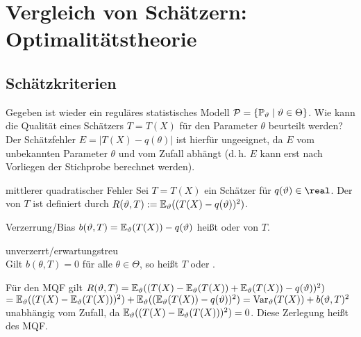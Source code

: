 \section{%
    Vergleich von Schätzern: Optimalitätstheorie%
}

\subsection{%
    Schätzkriterien%
}

\begin{Bem}
    Gegeben ist wieder ein reguläres statistisches Modell
    $\mathcal{P} = \{\mathbb{P}_\vartheta \;|\; \vartheta \in \Theta\}$.
    Wie kann die Qualität eines Schätzers $T = T(X)$ für den Parameter $\theta$ beurteilt werden?\\
    Der Schätzfehler $E = |T(X) - q(\theta)|$ ist hierfür ungeeignet, da
    $E$ vom unbekannten Parameter $\theta$ und vom Zufall abhängt
    (d.\,h. $E$ kann erst nach Vorliegen der Stichprobe berechnet werden).
\end{Bem}

\begin{Def}{mittlerer quadratischer Fehler}
    Sei $T = T(X)$ ein Schätzer für $q(\theta) \in \real$.
    Der  von $T$ ist definiert durch
    $R(\vartheta, T) := \mathbb{E}_\vartheta((T(X) - q(\vartheta))^2)$.
\end{Def}

\begin{Def}{Verzerrung/Bias}
    $b(\vartheta, T) = \mathbb{E}_\vartheta(T(X)) - q(\vartheta)$ heißt 
    oder  von $T$.
\end{Def}

\begin{Def}{unverzerrt/erwartungstreu}\\
    Gilt $b(\theta, T) = 0$ für alle $\theta \in \Theta$, so heißt
    $T$  oder .
\end{Def}

\begin{Bem}
    Für den MQF gilt
    $R(\vartheta, T) = \mathbb{E}_\vartheta((T(X) - \mathbb{E}_\vartheta(T(X)) + \mathbb{E}_\vartheta(T(X)) - q(\vartheta))^2)$\\
    $= \mathbb{E}_\vartheta((T(X) - \mathbb{E}_\vartheta(T(X)))^2) + \mathbb{E}_\vartheta((\mathbb{E}_\vartheta(T(X)) - q(\vartheta))^2)
    = \mathrm{Var}_\vartheta(T(X)) + b(\vartheta, T)^2$
    unabhängig vom Zufall, da $\mathbb{E}_\vartheta((T(X) - \mathbb{E}_\vartheta(T(X)))^2) = 0$.
    Diese Zerlegung heißt  des MQF.
\end{Bem}


